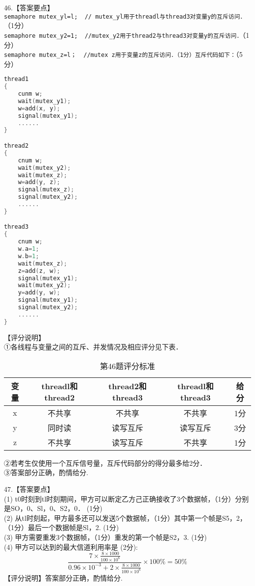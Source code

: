 46.【答案要点】 \\
\verb|semaphore mutex_yl=l;  // mutex_yl用于threadl与thread3对变量y的互斥访问．|（1分） \\
\verb|semaphore mutex_y2=1;  //mutex_y2用于thread2与thread3对变量y的互斥访问．|（1分） \\
\verb|semaphore mutex_z=l；  //mutex z用于变量z的互斥访问．（1分）互斥代码如下：|（5分） \\
\begin{lstlisting}[language=cpp]
thread1
{
    cunm w;
    wait(mutex_y1);
    w=add(x, y);
    signal(mutex_y1);
    ......
}

thread2
{
    cnum w;
    wait(mutex_y2);
    wait(mutex_z);
    w=add(y, z);
    signal(mutex_z);
    signal(mutex_y2);
    ......
}

thread3
{
    cnum w;
    w.a=1;
    w.b=1;
    wait(mutex_z);
    z=add(z, w);
    signal(mutex_y1);
    wait(mutex_y2);
    y=add(y, w);
    signal(mutex_y1);
    signal(mutex_y2);
    ......
}
\end{lstlisting}
【评分说明】 \\
①各线程与变量之间的互斥、并发情况及相应评分见下表．
\begin{table}[ht]
\centering
\caption{第46题评分标准}\label{CSN17_tab4}
\begin{tabular}{|c|c|c|c|c|}
\hline
变量 & threadl和thread2 & thread2和thread3 & threadl和thread3 & 给分 \\
\hline
x & 不共享 & 不共享 & 不共享 & 1分 \\
\hline
y & 同时读 & 读写互斥 & 读写互斥 & 3分 \\
\hline
z & 不共享 & 读写互斥 & 不共享 & 1分 \\
\hline
\end{tabular}
\end{table}
②若考生仅使用一个互斥信号量，互斥代码部分的得分最多给2分． \\
③答案部分正确，酌情给分.

47.【答案要点】 \\
(1) t0时刻到tl时刻期间，甲方可以断定乙方己正确接收了3个数据帧，（1分）分别是SO，0、Sl，0、S2，0． (1分) \\
(2) 从tl时刻起，甲方最多还可以发送5个数据帧，（1分）其中第一个帧是S5，2，（1分）最后一个数据帧是Sl，2. (1分) \\
(3) 甲方需要重发3个数据帧，（1分）重发的第一个帧是S2，3. (1分) \\
(4) 甲方可以达到的最大信道利用率是 (2分): \\
\begin{equation}
\frac{7 \times \frac{8\times1000}{100\times10^6}}{0.96\times10^{-3}+2\times\frac{8\times1000}{100\times10^6}}\times100\%=50\%
\end{equation}
【评分说明】答案部分正确，酌情给分.
